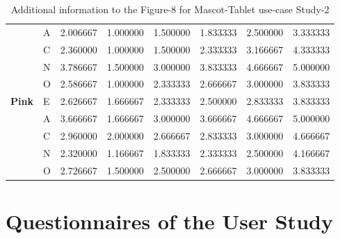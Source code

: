 \begin{table}[H]
\begin{center}
\begin{tabular}{ |p{2cm}| p{0.5cm}|p{1.5cm}|p{1.5cm}| p{1.5cm}|p{1.5cm}|p{1.5cm}| p{1.5cm}| }
&     A & 2.006667 & 1.000000 &1.500000& 1.833333& 2.500000 &3.333333\\
& C & 2.360000 & 1.000000 &1.500000 &2.333333& 3.166667 &4.333333\\
&       N & 3.786667 & 1.500000 &3.000000& 3.833333 &4.666667 &5.000000\\
&          O & 2.586667 & 1.000000 &2.333333 &2.666667 &3.000000 &3.833333\\
 \hline 
 \hline 
 \multirow{5}{*}{\textbf{Pink}} 
&      E & 2.626667 & 1.666667 &2.333333 &2.500000 &2.833333 &3.833333\\
&     A & 3.666667 & 1.666667 &3.000000& 3.666667& 4.666667 &5.000000\\
& C & 2.960000 & 2.000000 &2.666667 &2.833333 &3.000000 &4.666667\\
&       N & 2.320000 & 1.166667 &1.833333 &2.333333 &2.500000 &4.166667\\
&          O & 2.726667 & 1.500000 &2.500000 &2.666667 &3.000000 &3.833333\\
 \hline 
\end{tabular}
\end{center}
\caption{Additional information to the Figure-8 for Mascot-Tablet use-case Study-2}
\end{table}

\chapter{Questionnaires of the User Study}

 
 
 
 